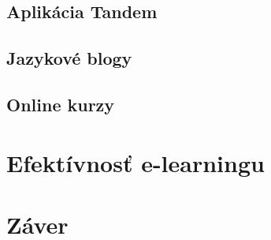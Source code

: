 \documentclass[10pt,twoside,slovak,a4paper]{article}
\begin{document}
\subsection{Aplikácia Tandem}

\subsection{Jazykové blogy}

\subsection{Online kurzy}

\section{Efektívnosť e-learningu}

\section{Záver}



\end{document}
